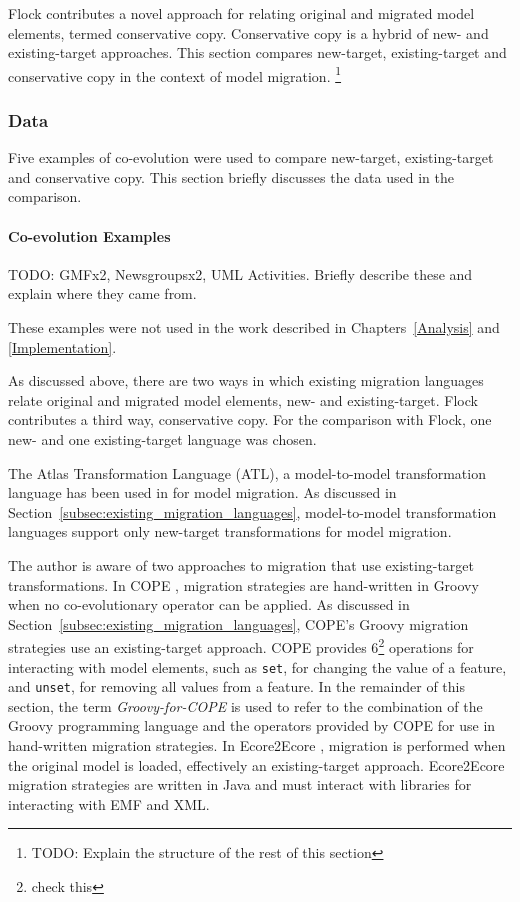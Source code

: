 Flock contributes a novel approach for relating original and migrated model elements, termed conservative copy. Conservative copy is a hybrid of new- and existing-target approaches. This section compares new-target, existing-target and conservative copy in the context of model migration. \footnote{TODO: Explain the structure of the rest of this section}

\subsubsection{Data}
Five examples of co-evolution were used to compare new-target, existing-target and conservative copy. This section briefly discusses the data used in the comparison.

\paragraph{Co-evolution Examples}
TODO: GMFx2, Newsgroupsx2, UML Activities. Briefly describe these and explain where they came from.

These examples were not used in the work described in Chapters~\ref{Analysis} and \ref{Implementation}.

As discussed above, there are two ways in which existing migration languages relate original and migrated model elements, new- and existing-target. Flock contributes a third way, conservative copy. For the comparison with Flock, one new- and one existing-target language was chosen.

The Atlas Transformation Language (ATL), a model-to-model transformation language has been used in \cite{cicchetti,garces} for model migration. As discussed in Section~\ref{subsec:existing_migration_languages}, model-to-model transformation languages support only new-target transformations for model migration.

The author is aware of two approaches to migration that use existing-target transformations. In COPE \cite{cope}, migration strategies are hand-written in Groovy when no co-evolutionary operator can be applied. As discussed in Section~\ref{subsec:existing_migration_languages}, COPE's Groovy migration strategies use an existing-target approach. COPE provides 6\footnote{check this} operations for interacting with model elements, such as \texttt{set}, for changing the value of a feature, and \texttt{unset}, for removing all values from a feature. In the remainder of this section, the term \emph{Groovy-for-COPE} is used to refer to the combination of the Groovy programming language and the operators provided by COPE for use in hand-written migration strategies. In Ecore2Ecore \cite{ecore2ecore}, migration is performed when the original model is loaded, effectively an existing-target approach. Ecore2Ecore migration strategies are written in Java and must interact with libraries for interacting with EMF and XML.

